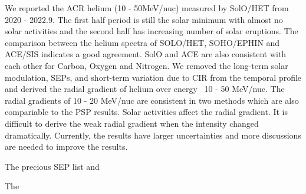 We reported the ACR helium (10 - 50MeV/nuc) measured by SolO/HET from 2020 - 2022.9. The first half period is still the solar minimum with almost no solar activities and the second half has increasing number of solar eruptions.
The comparison between the helium spectra of SOLO/HET, SOHO/EPHIN and ACE/SIS indicates a good agreement. SolO and ACE are also consistent with each other for Carbon, Oxygen and Nitrogen.
We removed the long-term solar modulation, SEPs, and short-term variation due to CIR from the temporal profile and derived the radial gradient of helium over energy ~10 - 50 MeV/nuc.
The radial gradients of 10 - 20 MeV/nuc are consistent in two methods which are also compariable to the PSP results.
Solar activities affect the radial gradient. It is difficult to derive the weak radial gradient when the intensity changed dramatically.
Currently, the results have larger uncertainties and more discussions are needed to improve the results.


The precious SEP list and


The



%

